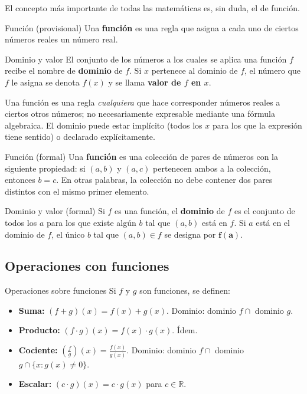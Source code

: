 \documentclass[12pt]{article}
\begin{document}
El concepto más importante de todas las matemáticas es, sin duda, el de función.

\begin{definicion}[]{Función (provisional)}
Una \textbf{función} es una regla que asigna a cada uno de ciertos números reales un número real.
\end{definicion}

\begin{definicion}[]{Dominio y valor}
El conjunto de los números a los cuales se aplica una función $f$ recibe el nombre de \textbf{dominio} de $f$. Si $x$ pertenece al dominio de $f$, el número que $f$ le asigna se denota $f(x)$ y se llama \textbf{valor de $f$ en $x$}.
\end{definicion}

\begin{nota}[]{}
Una función es una regla \textit{cualquiera} que hace corresponder números reales a ciertos otros números; no necesariamente expresable mediante una fórmula algebraica. El dominio puede estar implícito (todos los $x$ para los que la expresión tiene sentido) o declarado explícitamente.
\end{nota}

\begin{definicion}[]{Función (formal)}
Una \textbf{función} es una colección de pares de números con la siguiente propiedad: si $(a, b)$ y $(a, c)$ pertenecen ambos a la colección, entonces $b = c$. En otras palabras, la colección no debe contener dos pares distintos con el mismo primer elemento.
\end{definicion}

\begin{definicion}[]{Dominio y valor (formal)}
Si $f$ es una función, el \textbf{dominio} de $f$ es el conjunto de todos los $a$ para los que existe algún $b$ tal que $(a, b)$ está en $f$. Si $a$ está en el dominio de $f$, el único $b$ tal que $(a, b) \in f$ se designa por $\mathbf{f(a)}$.
\end{definicion}

\subsection{Operaciones con funciones}

\begin{definicion}[]{Operaciones sobre funciones}
Si $f$ y $g$ son funciones, se definen:
\begin{itemize}
  \item \textbf{Suma:} $(f + g)(x) = f(x) + g(x)$. Dominio: dominio $f \cap$ dominio $g$.
  \item \textbf{Producto:} $(f \cdot g)(x) = f(x) \cdot g(x)$. Ídem.
  \item \textbf{Cociente:} $\displaystyle\left(\frac{f}{g}\right)(x) = \frac{f(x)}{g(x)}$. Dominio: dominio $f \cap$ dominio $g \cap \{x : g(x) \neq 0\}$.
  \item \textbf{Escalar:} $(c \cdot g)(x) = c \cdot g(x)$ para $c \in \mathbb{R}$.
\end{itemize}
\end{definicion}
\end{document}

